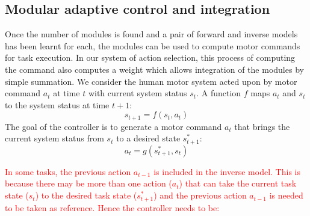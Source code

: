 \subsection{Modular adaptive control and integration}
\label{sec:control}

Once the number of modules is found and a pair of forward and inverse
models has been learnt for each, the modules can be used to compute
motor commands for task execution.  In our system of action selection,
this process of computing the command also computes a weight which
allows integration of the modules by simple summation.  We consider
the human motor system acted upon by motor command $a_t$ at time $t$
with current system status $s_t$. A function $f$ maps $a_t$ and $s_t$
to the system status at time $t+1$:
\begin{equation}
\label{e1}
s_{t+1} = f\left(s_t,a_t\right)
\end{equation}
The goal of the controller is to generate a motor command $a_t$ that
brings the current system status from $s_t$ to a desired state $s^*_{t+1}$:
\begin{equation}
\label{e2}
a_t = g\left({s^*_{t+1},s_t}\right)
\end{equation}

\textcolor{red}{In some tasks, the previous action $a_{t-1}$ is included in the inverse model. This is because there may be more than one action ($a_t$) that can take the current task state ($s_t$) to the desired task state ($s^*_{t+1}$) and the previous action $a_{t-1}$ is needed to be taken as reference. Hence the controller needs to be:}

